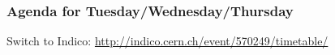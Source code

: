 \begin{frame}
\frametitle{Agenda for Tuesday/Wednesday/Thursday}

  Switch to Indico: \url{http://indico.cern.ch/event/570249/timetable/}

\end{frame}


